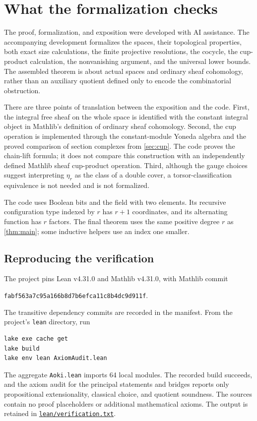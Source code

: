 \section{What the formalization checks}
\label{sec:formalization}

The proof, formalization, and exposition were developed with AI assistance.
The accompanying development formalizes the spaces, their topological
properties, both exact size calculations, the finite projective
resolutions, the cocycle, the cup-product calculation, the nonvanishing
argument, and the universal lower bounds. The assembled theorem is about
actual spaces and ordinary sheaf cohomology, rather than an auxiliary
quotient defined only to encode the combinatorial obstruction.

There are three points of translation between the exposition and the
code. First, the integral free sheaf on the whole space is identified
with the constant integral object in Mathlib's definition of ordinary
sheaf cohomology. Second, the cup operation is implemented through the
constant-module Yoneda algebra and the proved comparison of section
complexes from \cref{sec:cup}. The code proves the chain-lift formula;
it does not compare this construction with an independently defined
Mathlib sheaf cup-product operation. Third, although the gauge choices
suggest interpreting \(\eta_r\) as the class of a double cover, a
torsor-classification equivalence is not needed and is not formalized.

The code uses Boolean bits and the field with two elements. Its recursive
configuration type indexed by \(r\) has \(r+1\) coordinates, and its
alternating function has \(r\) factors. The final theorem uses the same
positive degree \(r\) as \cref{thm:main}; some inductive helpers use
an index one smaller.

\subsection{Reproducing the verification}

The project pins Lean v4.31.0 and Mathlib v4.31.0, with Mathlib commit
\begin{center}
\small\nolinkurl{fabf563a7c95a166b8d7b6efca11c8b4dc9d911f}.
\end{center}
The transitive dependency commits are recorded in the manifest. From the
project's \texttt{lean} directory, run
\begin{verbatim}
lake exe cache get
lake build
lake env lean AxiomAudit.lean
\end{verbatim}
The aggregate \texttt{Aoki.lean} imports 64 local modules. The recorded
build succeeds, and the axiom audit for the principal statements and
bridges reports only propositional extensionality, classical choice,
and quotient soundness. The sources contain no proof placeholders or
additional mathematical axioms. The output is retained in
\href{../../../lean/verification.txt}{\texttt{lean/verification.txt}}.

